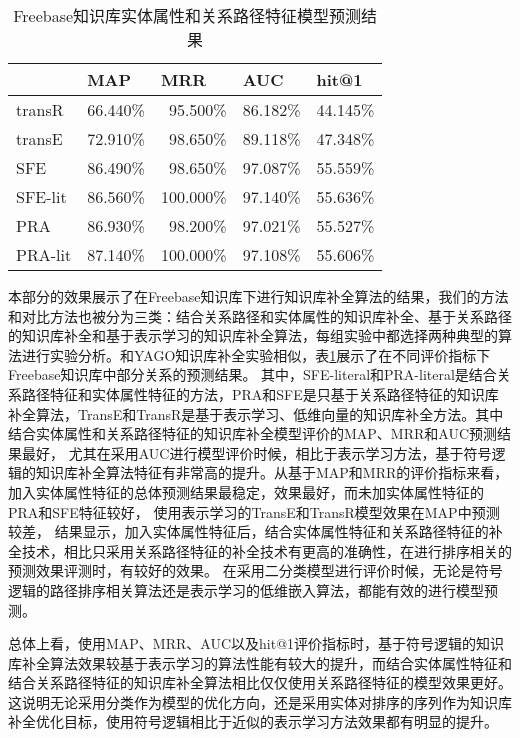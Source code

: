 \begin{table}[htbp]
  \centering
  \caption{Freebase知识库实体属性和关系路径特征模型预测结果}
    \begin{tabular}{|l|r|r|r|r|}
    \hline
          & \multicolumn{1}{l|}{MAP} & \multicolumn{1}{l|}{MRR} & \multicolumn{1}{l|}{AUC} & \multicolumn{1}{l|}{hit@1} \\
    \hline
    transR & 66.440\% & 95.500\% & 86.182\% & 44.145\% \\
    \hline
    transE & 72.910\% & 98.650\% & 89.118\% & 47.348\% \\
    \hline
    SFE   & 86.490\% & 98.650\% & 97.087\% & 55.559\% \\
    \hline
    SFE-lit & 86.560\% & 100.000\% & 97.140\% & 55.636\% \\
    \hline
    PRA   & 86.930\% & 98.200\% & 97.021\% & 55.527\% \\
    \hline
    PRA-lit & 87.140\% & 100.000\% & 97.108\% & 55.606\% \\
    \hline
    \end{tabular}%
  \label{tab:addlabel-fb}%
\end{table}%
本部分的效果展示了在Freebase知识库下进行知识库补全算法的结果，我们的方法和对比方法也被分为三类：结合关系路径和实体属性的知识库补全、基于关系路径的知识库补全和基于表示学习的知识库补全算法，每组实验中都选择两种典型的算法进行实验分析。和YAGO知识库补全实验相似，表\ref{tab:addlabel-fb}展示了在不同评价指标下Freebase知识库中部分关系的预测结果。
其中，SFE-literal和PRA-literal是结合关系路径特征和实体属性特征的方法，PRA和SFE是只基于关系路径特征的知识库补全算法，TransE和TransR是基于表示学习、低维向量的知识库补全方法。其中结合实体属性和关系路径特征的知识库补全模型评价的MAP、MRR和AUC预测结果最好，
尤其在采用AUC进行模型评价时候，相比于表示学习方法，基于符号逻辑的知识库补全算法特征有非常高的提升。从基于MAP和MRR的评价指标来看，加入实体属性特征的总体预测结果最稳定，效果最好，而未加实体属性特征的PRA和SFE特征较好，
使用表示学习的TransE和TransR模型效果在MAP中预测较差，
结果显示，加入实体属性特征后，结合实体属性特征和关系路径特征的补全技术，相比只采用关系路径特征的补全技术有更高的准确性，在进行排序相关的预测效果评测时，有较好的效果。
在采用二分类模型进行评价时候，无论是符号逻辑的路径排序相关算法还是表示学习的低维嵌入算法，都能有效的进行模型预测。

总体上看，使用MAP、MRR、AUC以及hit@1评价指标时，基于符号逻辑的知识库补全算法效果较基于表示学习的算法性能有较大的提升，而结合实体属性特征和结合关系路径特征的知识库补全算法相比仅仅使用关系路径特征的模型效果更好。这说明无论采用分类作为模型的优化方向，还是采用实体对排序的序列作为知识库补全优化目标，使用符号逻辑相比于近似的表示学习方法效果都有明显的提升。


